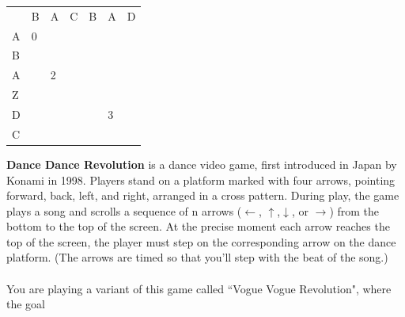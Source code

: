 \documentclass[12pt]{article}
\begin{document}
\begin{table}[]
    \begin{tabular}{lllllll}
                           & B                      & A                      & C                     & B                     & A                      & D                     \\ \cline{2-7} 
    \multicolumn{1}{l|}{A} & \multicolumn{1}{l|}{0} & \multicolumn{1}{l|}{}  & \multicolumn{1}{l|}{} & \multicolumn{1}{l|}{} & \multicolumn{1}{l|}{}  & \multicolumn{1}{l|}{} \\ \cline{2-7} 
    \multicolumn{1}{l|}{B} & \multicolumn{1}{l|}{}  & \multicolumn{1}{l|}{}  & \multicolumn{1}{l|}{} & \multicolumn{1}{l|}{} & \multicolumn{1}{l|}{}  & \multicolumn{1}{l|}{} \\ \cline{2-7} 
    \multicolumn{1}{l|}{A} & \multicolumn{1}{l|}{}  & \multicolumn{1}{l|}{2} & \multicolumn{1}{l|}{} & \multicolumn{1}{l|}{} & \multicolumn{1}{l|}{}  & \multicolumn{1}{l|}{} \\ \cline{2-7} 
    \multicolumn{1}{l|}{Z} & \multicolumn{1}{l|}{}  & \multicolumn{1}{l|}{}  & \multicolumn{1}{l|}{} & \multicolumn{1}{l|}{} & \multicolumn{1}{l|}{}  & \multicolumn{1}{l|}{} \\ \cline{2-7} 
    \multicolumn{1}{l|}{D} & \multicolumn{1}{l|}{}  & \multicolumn{1}{l|}{}  & \multicolumn{1}{l|}{} & \multicolumn{1}{l|}{} & \multicolumn{1}{l|}{3} & \multicolumn{1}{l|}{} \\ \cline{2-7} 
    \multicolumn{1}{l|}{C} & \multicolumn{1}{l|}{}  & \multicolumn{1}{l|}{}  & \multicolumn{1}{l|}{} & \multicolumn{1}{l|}{} & \multicolumn{1}{l|}{}  & \multicolumn{1}{l|}{} \\ \cline{2-7} 
    \end{tabular}
    \end{table}
    \FloatBarrier
\noindent \textbf{Dance Dance Revolution} is a dance video game, 
first introduced in Japan by Konami in
1998. Players stand on a platform marked 
with four arrows, pointing forward, back, left,
and right, arranged in a cross pattern. 
During play, the game plays a song and scrolls a
sequence of n arrows ($\leftarrow$, $\uparrow$,$\downarrow$, or $\rightarrow$) from the 
bottom to the top of the screen. At the
precise moment each arrow reaches the top of the 
screen, the player must step on the
corresponding arrow on the dance platform. (The 
arrows are timed so that you’ll step with
the beat of the song.)\\\\
You are playing a variant of this game called ``Vogue Vogue Revolution", where the goal
\end{document}
